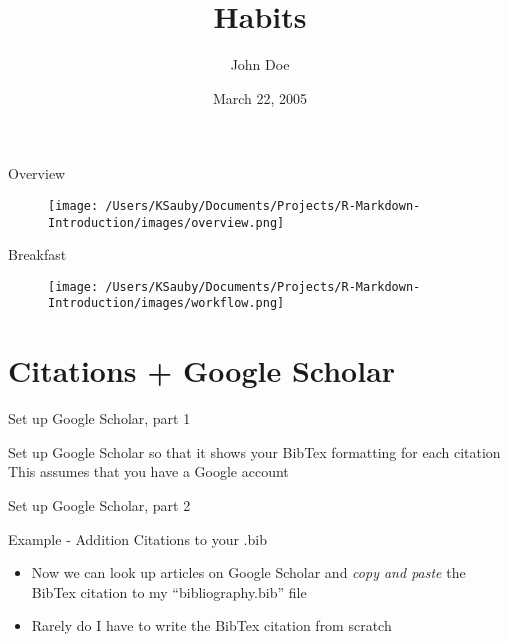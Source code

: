 \documentclass[ignorenonframetext,]{beamer}
\title{Habits}
\author{John Doe}
\date{March 22, 2005}
\providecommand{\tightlist}{%
  \setlength{\itemsep}{0pt}\setlength{\parskip}{0pt}}
\begin{document}
\frame{\titlepage}

\begin{frame}{Overview}

\begin{figure}[!h]
  \centering
    
  \noindent \texttt{[image: /Users/KSauby/Documents/Projects/R-Markdown-Introduction/images/overview.png]}
    
\end{figure}

\end{frame}

\begin{frame}{Breakfast}

\begin{figure}[!h]
  \centering
    
  \noindent \texttt{[image: /Users/KSauby/Documents/Projects/R-Markdown-Introduction/images/workflow.png]}

\end{figure}

\end{frame}

\section{Citations + Google Scholar}\label{citations-google-scholar}

\begin{frame}{Set up Google Scholar, part 1}

Set up Google Scholar so that it shows your BibTex formatting for each
citation This assumes that you have a Google account

\end{frame}

\begin{frame}{Set up Google Scholar, part 2}

\end{frame}

\begin{frame}{Example - Addition Citations to your .bib}

\begin{itemize}
\tightlist
\item
  Now we can look up articles on Google Scholar and \emph{copy and
  paste} the BibTex citation to my ``bibliography.bib'' file
\item
  Rarely do I have to write the BibTex citation from scratch
\end{itemize}

\end{frame}
\end{document}
